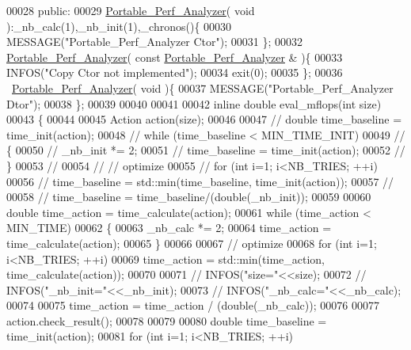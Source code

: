 \begin{DoxyCode}
00028 \textcolor{keyword}{public}:
00029   \hyperlink{class_portable___perf___analyzer}{Portable\_Perf\_Analyzer}( \textcolor{keywordtype}{void} ):\_nb\_calc(1),\_nb\_init(1),\_chronos()\{
00030     MESSAGE(\textcolor{stringliteral}{"Portable\_Perf\_Analyzer Ctor"});
00031   \};
00032   \hyperlink{class_portable___perf___analyzer}{Portable\_Perf\_Analyzer}( \textcolor{keyword}{const} \hyperlink{class_portable___perf___analyzer}{Portable\_Perf\_Analyzer} & )\{
00033     INFOS(\textcolor{stringliteral}{"Copy Ctor not implemented"});
00034     exit(0);
00035   \};
00036   ~\hyperlink{class_portable___perf___analyzer}{Portable\_Perf\_Analyzer}( \textcolor{keywordtype}{void} )\{
00037     MESSAGE(\textcolor{stringliteral}{"Portable\_Perf\_Analyzer Dtor"});
00038   \};
00039 
00040 
00041 
00042   \textcolor{keyword}{inline} \textcolor{keywordtype}{double} eval\_mflops(\textcolor{keywordtype}{int} size)
00043   \{
00044 
00045     Action action(size);
00046 
00047 \textcolor{comment}{//     double time\_baseline = time\_init(action);}
00048 \textcolor{comment}{//     while (time\_baseline < MIN\_TIME\_INIT)}
00049 \textcolor{comment}{//     \{}
00050 \textcolor{comment}{//       \_nb\_init *= 2;}
00051 \textcolor{comment}{//       time\_baseline = time\_init(action);}
00052 \textcolor{comment}{//     \}}
00053 \textcolor{comment}{//}
00054 \textcolor{comment}{//     // optimize}
00055 \textcolor{comment}{//     for (int i=1; i<NB\_TRIES; ++i)}
00056 \textcolor{comment}{//       time\_baseline = std::min(time\_baseline, time\_init(action));}
00057 \textcolor{comment}{//}
00058 \textcolor{comment}{//     time\_baseline = time\_baseline/(double(\_nb\_init));}
00059 
00060     \textcolor{keywordtype}{double} time\_action = time\_calculate(action);
00061     \textcolor{keywordflow}{while} (time\_action < MIN\_TIME)
00062     \{
00063       \_nb\_calc *= 2;
00064       time\_action = time\_calculate(action);
00065     \}
00066 
00067     \textcolor{comment}{// optimize}
00068     \textcolor{keywordflow}{for} (\textcolor{keywordtype}{int} i=1; i<NB\_TRIES; ++i)
00069       time\_action = std::min(time\_action, time\_calculate(action));
00070 
00071 \textcolor{comment}{//     INFOS("size="<<size);}
00072 \textcolor{comment}{//     INFOS("\_nb\_init="<<\_nb\_init);}
00073 \textcolor{comment}{//     INFOS("\_nb\_calc="<<\_nb\_calc);}
00074 
00075     time\_action = time\_action / (double(\_nb\_calc));
00076 
00077     action.check\_result();
00078 
00079 
00080     \textcolor{keywordtype}{double} time\_baseline = time\_init(action);
00081     \textcolor{keywordflow}{for} (\textcolor{keywordtype}{int} i=1; i<NB\_TRIES; ++i)

\end{DoxyCode}
